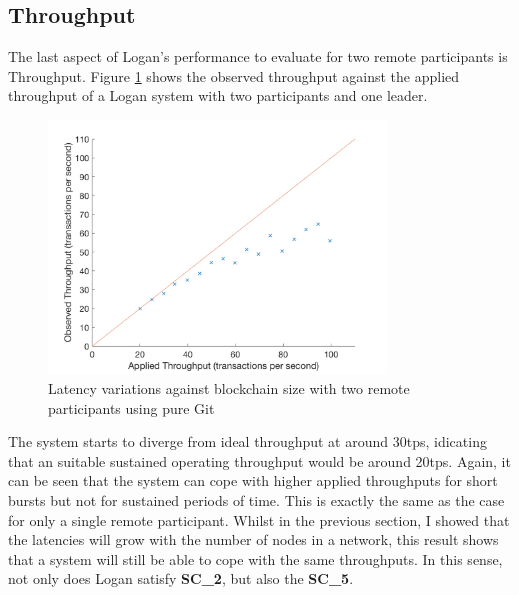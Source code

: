 \documentclass[12pt,a4paper,twoside,openright]{report}
\begin{document}
	\subsection{Throughput}
	The last aspect of Logan's performance to evaluate for two remote participants is Throughput.
	Figure \ref{figs:tworemthrthr} shows the observed throughput against the applied throughput of a Logan system with two participants and one leader.
	\begin{figure}
		\centering
		\includegraphics[width=0.8\textwidth]{figs/appliedvsobserved2r.png}
		\caption{Latency variations against blockchain size with two remote participants using pure Git}
		\label{figs:tworemthrthr}
	\end{figure}
	The system starts to diverge from ideal throughput at around 30tps, idicating that an suitable sustained operating throughput would be around 20tps.
	Again, it can be seen that the system can cope with higher applied throughputs for short bursts  but not for sustained periods of time. 
	This is exactly the same as the case for only a single remote participant. 
	Whilst in the previous section, I showed that the latencies will grow with the number of nodes in a network, this result shows that a system will still be able to cope with the same throughputs. 
	In this sense, not only does Logan satisfy \textbf{SC\_2}, but also the \textbf{SC\_5}.
\end{document}
